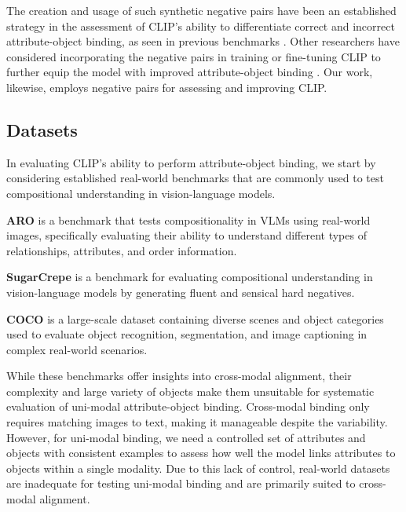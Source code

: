 The creation and usage of such synthetic negative pairs have been an established strategy in the assessment of CLIP’s ability to differentiate correct and incorrect attribute-object binding, as seen in previous benchmarks \cite{Yuksekgonul2023, thrush2022winoground, hsieh2024sugarcrepe}. Other researchers have considered incorporating the negative pairs in training or fine-tuning CLIP to further equip the model with improved attribute-object binding \cite{Yuksekgonul2023, patel2024tripletclip}. Our work, likewise, employs negative pairs for assessing and improving CLIP.













\noindent
\subsection{Datasets}
\label{sec:datasets}

In evaluating CLIP’s ability to perform attribute-object binding, we start by considering established real-world benchmarks that are commonly used to test compositional understanding in vision-language models.

    \textbf{ARO} \cite{Yuksekgonul2023} is a benchmark that tests compositionality in VLMs using real-world images, specifically evaluating their ability to understand different types of relationships, attributes, and order information.

    \textbf{SugarCrepe} \cite{hsieh2024sugarcrepe} is a benchmark for evaluating compositional understanding in vision-language models by generating fluent and sensical hard negatives.

    \textbf{COCO} \cite{lin2014coco} is a large-scale dataset containing diverse scenes and object categories used to evaluate object recognition, segmentation, and image captioning in complex real-world scenarios.


While these benchmarks offer insights into cross-modal alignment, their complexity and large variety of objects make them unsuitable for systematic evaluation of uni-modal attribute-object binding. Cross-modal binding only requires matching images to text, making it manageable despite the variability. However, for uni-modal binding, we need a controlled set of attributes and objects with consistent examples to assess how well the model links attributes to objects within a single modality. Due to this lack of control, real-world datasets are inadequate for testing uni-modal binding and are primarily suited to cross-modal alignment.

